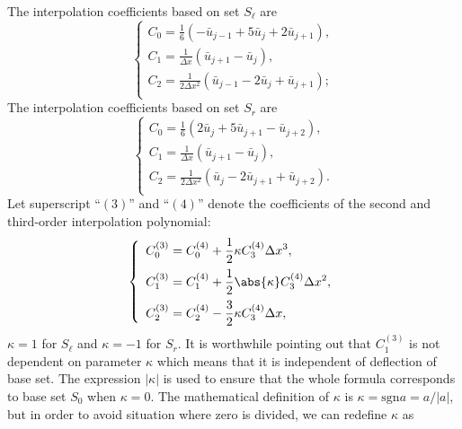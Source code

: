 \documentclass[]{article}
\begin{document}
The interpolation coefficients based on set 
$S_\ell$ are
\begin{equation*}
  \left\{\begin{array}{l}
  \displaystyle
  C_0 = \frac{1}{6}(-\bar u_{j-1}+5\bar u_j+2\bar u_{j+1}),\\[3mm]
  \displaystyle
  C_1= \frac{1}{\Delta x}(\bar u_{j+1}-\bar u_{j}),\\[3mm]
  \displaystyle
  C_2 = \frac{1}{2\Delta x^2}(\bar u_{j-1}-2\bar u_j+\bar u_{j+1});\\[3mm]
  \end{array}\right.
\end{equation*}
The interpolation coefficients based on set $S_r$ are
\begin{equation*}
  \left\{\begin{array}{l}
  \displaystyle
  C_0 = \frac{1}{6}(2\bar u_{j}+5\bar u_{j+1}-\bar u_{j+2}),\\[3mm]
  \displaystyle
  C_1= \frac{1}{\Delta x}(\bar u_{j+1}-\bar u_{j}),\\[3mm]
  \displaystyle
  C_2 = \frac{1}{2\Delta x^2}(\bar u_{j}-2\bar u_{j+1}+\bar u_{j+2}).\\[3mm]
  \end{array}\right.
\end{equation*}
Let superscript ``$(3)$'' and ``$(4)$'' denote the coefficients of the second
and third-order interpolation polynomial:
\begin{equation}
  \left\{\begin{array}{l}
  \displaystyle
  C_0^{(3)}=C_0^{(4)}+\frac{1}{2}\kappa C_3^{(4)}\Delta x^3, \\[3mm]
  \displaystyle
  C_1^{(3)}=C_1^{(4)}+\frac{1}{2}\abs{\kappa} C_3^{(4)}\Delta x^2, \\[3mm]
  \displaystyle
  C_2^{(3)}=C_2^{(4)}-\frac{3}{2}\kappa C_3^{(4)}\Delta x, \\
  \end{array}\right.
  \label{eq:ave-C-34}
\end{equation}
$\kappa = 1$ for $S_\ell$ and $\kappa = -1$ for $S_r$. It is worthwhile pointing
out that $C_1^{(3)}$ is not dependent on parameter $\kappa$ which means that it
is independent of deflection of base set. The expression $|\kappa|$ is used to
ensure that the whole formula corresponds to base set $S_0$ when $\kappa=0$. The
mathematical definition of $\kappa$ is $\kappa = \mathrm{sgn} a = a/|a|$, but
in order to avoid situation where zero is divided, we can redefine $\kappa$ as
\end{document}
